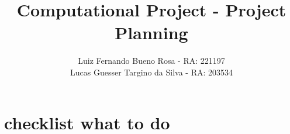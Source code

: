 \documentclass{article}
\title{Computational Project - Project Planning}
\author{
	Luiz Fernando Bueno Rosa - RA: 221197 \\
	Lucas Guesser Targino da Silva - RA: 203534
}
\theoremstyle{definition}
\begin{document}
\maketitle

\section{checklist what to do}







\end{document}

